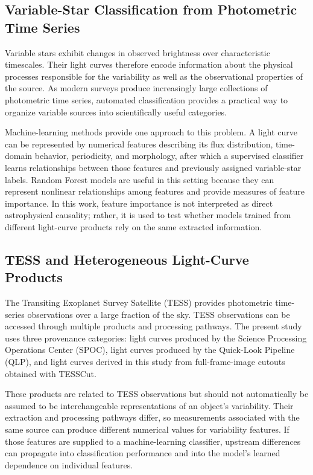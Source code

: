 \documentclass[linenumbers]{aastex701}
\begin{document}
\subsection{Variable-Star Classification from Photometric Time Series}
Variable stars exhibit changes in observed brightness over characteristic timescales. Their light curves therefore encode information about the physical processes responsible for the variability as well as the observational properties of the source. As modern surveys produce increasingly large collections of photometric time series, automated classification provides a practical way to organize variable sources into scientifically useful categories.

Machine-learning methods provide one approach to this problem. A light curve can be represented by numerical features describing its flux distribution, time-domain behavior, periodicity, and morphology, after which a supervised classifier learns relationships between those features and previously assigned variable-star labels. Random Forest models are useful in this setting because they can represent nonlinear relationships among features and provide measures of feature importance. In this work, feature importance is not interpreted as direct astrophysical causality; rather, it is used to test whether models trained from different light-curve products rely on the same extracted information.


\subsection{TESS and Heterogeneous Light-Curve Products}
The Transiting Exoplanet Survey Satellite (TESS) provides photometric time-series observations over a large fraction of the sky. TESS observations can be accessed through multiple products and processing pathways. The present study uses three provenance categories: light curves produced by the Science Processing Operations Center (SPOC), light curves produced by the Quick-Look Pipeline (QLP), and light curves derived in this study from full-frame-image cutouts obtained with TESSCut.

These products are related to TESS observations but should not automatically be assumed to be interchangeable representations of an object's variability. Their extraction and processing pathways differ, so measurements associated with the same source can produce different numerical values for variability features. If those features are supplied to a machine-learning classifier, upstream differences can propagate into classification performance and into the model's learned dependence on individual features.
\end{document}

